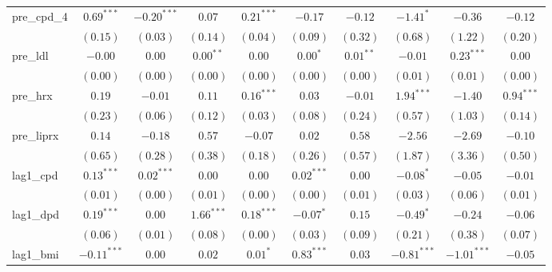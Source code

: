\begin{tabular}{l c c c c c c c c c}
pre\_cpd\_4      & $0.69^{***}$  & $-0.20^{***}$ & $0.07$        & $0.21^{***}$  & $-0.17$       & $-0.12$        & $-1.41^{*}$   & $-0.36$       & $-0.12$        \\
                 & $(0.15)$      & $(0.03)$      & $(0.14)$      & $(0.04)$      & $(0.09)$      & $(0.32)$       & $(0.68)$      & $(1.22)$      & $(0.20)$       \\
pre\_ldl         & $-0.00$       & $0.00$        & $0.00^{**}$   & $0.00$        & $0.00^{*}$    & $0.01^{**}$    & $-0.01$       & $0.23^{***}$  & $0.00$         \\
                 & $(0.00)$      & $(0.00)$      & $(0.00)$      & $(0.00)$      & $(0.00)$      & $(0.00)$       & $(0.01)$      & $(0.01)$      & $(0.00)$       \\
pre\_hrx         & $0.19$        & $-0.01$       & $0.11$        & $0.16^{***}$  & $0.03$        & $-0.01$        & $1.94^{***}$  & $-1.40$       & $0.94^{***}$   \\
                 & $(0.23)$      & $(0.06)$      & $(0.12)$      & $(0.03)$      & $(0.08)$      & $(0.24)$       & $(0.57)$      & $(1.03)$      & $(0.14)$       \\
pre\_liprx       & $0.14$        & $-0.18$       & $0.57$        & $-0.07$       & $0.02$        & $0.58$         & $-2.56$       & $-2.69$       & $-0.10$        \\
                 & $(0.65)$      & $(0.28)$      & $(0.38)$      & $(0.18)$      & $(0.26)$      & $(0.57)$       & $(1.87)$      & $(3.36)$      & $(0.50)$       \\
lag1\_cpd        & $0.13^{***}$  & $0.02^{***}$  & $0.00$        & $0.00$        & $0.02^{***}$  & $0.00$         & $-0.08^{*}$   & $-0.05$       & $-0.01$        \\
                 & $(0.01)$      & $(0.00)$      & $(0.01)$      & $(0.00)$      & $(0.00)$      & $(0.01)$       & $(0.03)$      & $(0.06)$      & $(0.01)$       \\
lag1\_dpd        & $0.19^{***}$  & $0.00$        & $1.66^{***}$  & $0.18^{***}$  & $-0.07^{*}$   & $0.15$         & $-0.49^{*}$   & $-0.24$       & $-0.06$        \\
                 & $(0.06)$      & $(0.01)$      & $(0.08)$      & $(0.00)$      & $(0.03)$      & $(0.09)$       & $(0.21)$      & $(0.38)$      & $(0.07)$       \\
lag1\_bmi        & $-0.11^{***}$ & $0.00$        & $0.02$        & $0.01^{*}$    & $0.83^{***}$  & $0.03$         & $-0.81^{***}$ & $-1.01^{***}$ & $-0.05$        \\

\end{tabular}
